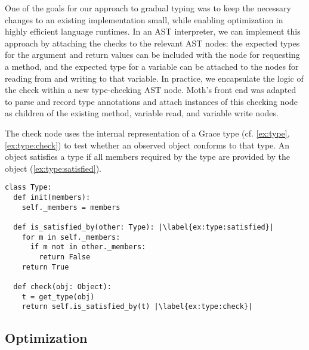 
One of the goals for our approach to gradual typing was to keep
the necessary changes to an existing implementation small,
while enabling optimization in highly efficient language runtimes.
%
In an AST interpreter, we can implement this approach by attaching the
checks to the relevant AST nodes: the expected types for the argument
and return values can be included with the node for requesting a
method, and the expected type for a variable can be attached to the
nodes for reading from and writing to that variable.  In practice, we
encapsulate the logic of the check within a new type-checking AST
node.  Moth's front end was adapted to parse and record type
annotations and attach instances of this checking node as children of the
existing method, variable read, and variable write nodes.



%

The check node uses the internal representation of a Grace type
(cf. \cref{ex:type}, \cref{ex:type:check}) to test whether an observed
object conforms to that type. 
An object satisfies a type if all members required by the type are provided
by the object (\cref{ex:type:satisfied}).


\begin{lstlisting}[label={ex:type},escapechar=|,caption={Sketch of a \code{Type} in our system and its \code{check()} semantics.},float,floatplacement=htb,columns=flexible]
class Type:
  def init(members):
    self._members = members

  def is_satisfied_by(other: Type): |\label{ex:type:satisfied}|
    for m in self._members:
      if m not in other._members:
        return False
    return True

  def check(obj: Object):
    t = get_type(obj)
    return self.is_satisfied_by(t) |\label{ex:type:check}|
\end{lstlisting}


\subsection{Optimization}
\label{ssec:optimization}



